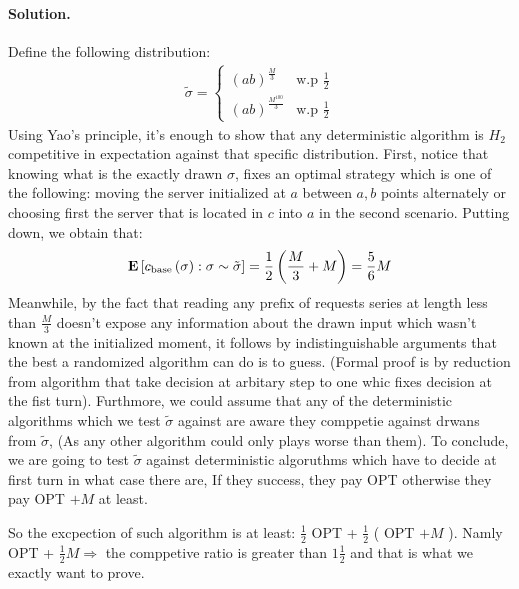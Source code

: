 \documentclass{article}
\begin{document}
\begin{multicols*}{2}
  \paragraph{Solution.} Define the following distribution: 
  \begin{equation*}
    \begin{split}
      \tilde{\sigma} = \begin{cases}
	(ab)^{\frac{M}{3}} & \text{w.p  } \frac{1}{2} \\ 
	(ab)^{\frac{M^{100}}{3}} &  \text{w.p  } \frac{1}{2}  
      \end{cases}
    \end{split}
  \end{equation*}
  Using Yao's principle, it's enough to show that any deterministic algorithm is $H_{2}$ competitive in expectation against that specific distribution. First, notice that knowing what is the exactly drawn $\sigma$, fixes an optimal strategy which is one of the following: moving the server initialized at $a$ between $a,b$ points alternately or choosing first the server that is located in $c$ into $a$ in the second scenario.
  Putting down, we obtain that: 
  \begin{equation*}
    \begin{split}
      \mathbf{E} \left[ { c_{\text{base}} \left( \sigma \right)   : \sigma \sim \tilde{\sigma}} \right] = \frac{1}{2} \left(  \frac{M}{3} + M  \right) = \frac{5}{6}M 
    \end{split}
  \end{equation*}
  Meanwhile, by the fact that reading any prefix of requests series at length less than $\frac{M}{3}$ doesn't expose any information about the drawn input which wasn't known at the initialized moment, it follows by indistinguishable arguments that the best a randomized algorithm can do is to guess. (Formal proof is by reduction from algorithm that take decision at arbitary step to one whic fixes decision at the fist turn). Furthmore, we could assume that any of the deterministic algorithms which we test $\tilde{\sigma}$ against are aware they comppetie against drwans from $\tilde{\sigma}$, (As any other algorithm could only plays worse than them). To conclude, we are going to test $\tilde{\sigma}$ against deterministic algoruthms which have to decide at first turn in what case there are, If they success, they pay OPT otherwise they pay OPT $ + M$ at least. 

  So the excpection of such algorithm is at least: $ \frac{1}{2} $ OPT + $ \frac{1}{2} $ ( OPT $+ M$ ). Namly OPT + $\frac{1}{2} M \Rightarrow $ the comppetive ratio is greater than $ 1\frac{1}{2}  $  and that is what we exactly want to prove.


\end{multicols*}
\end{document}
